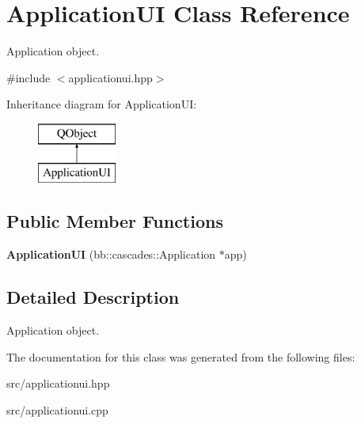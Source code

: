\hypertarget{class_application_u_i}{\section{Application\-U\-I Class Reference}
\label{class_application_u_i}
}


Application object.  




{\ttfamily \#include $<$applicationui.\-hpp$>$}

Inheritance diagram for Application\-U\-I\-:\begin{figure}[H]
\begin{center}
\leavevmode
\includegraphics[height=2.000000cm]{class_application_u_i}
\end{center}
\end{figure}
\subsection*{Public Member Functions}
\begin{DoxyCompactItemize}
\item 
\hypertarget{class_application_u_i_a1799d0645a3a41aec6bec5379e875d0a}{{\bfseries Application\-U\-I} (bb\-::cascades\-::\-Application $\ast$app)}\label{class_application_u_i_a1799d0645a3a41aec6bec5379e875d0a}

\end{DoxyCompactItemize}


\subsection{Detailed Description}
Application object. 

The documentation for this class was generated from the following files\-:\begin{DoxyCompactItemize}
\item 
src/applicationui.\-hpp\item 
src/applicationui.\-cpp\end{DoxyCompactItemize}
